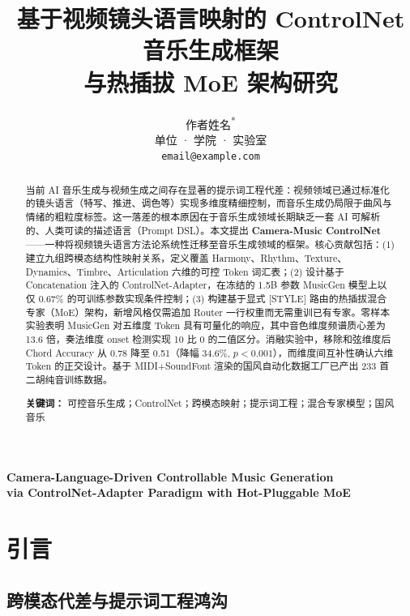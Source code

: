 \documentclass[11pt]{article}
\title{\vspace{-1.5cm}\bfseries 基于视频镜头语言映射的 ControlNet 音乐生成框架\\与热插拔 MoE 架构研究}
\author{作者姓名\textsuperscript{*} \\
{\small 单位 · 学院 · 实验室} \\
{\small \texttt{email@example.com}}}
\date{}
\begin{document}
\maketitle

\begin{center}
\textbf{Camera-Language-Driven Controllable Music Generation\\via ControlNet-Adapter Paradigm with Hot-Pluggable MoE}
\end{center}

\begin{abstract}
\noindent
当前 AI 音乐生成与视频生成之间存在显著的提示词工程代差：视频领域已通过标准化的镜头语言（特写、推进、调色等）实现多维度精细控制，而音乐生成仍局限于曲风与情绪的粗粒度标签。这一落差的根本原因在于音乐生成领域长期缺乏一套 AI 可解析的、人类可读的描述语言（Prompt DSL）。本文提出 \textbf{Camera-Music ControlNet}——一种将视频镜头语言方法论系统性迁移至音乐生成领域的框架。核心贡献包括：(1) 建立九组跨模态结构性映射关系，定义覆盖 Harmony、Rhythm、Texture、Dynamics、Timbre、Articulation 六维的可控 Token 词汇表；(2) 设计基于 Concatenation 注入的 ControlNet-Adapter，在冻结的 1.5B 参数 MusicGen 模型上以仅 0.67\% 的可训练参数实现条件控制；(3) 构建基于显式 [STYLE] 路由的热插拔混合专家（MoE）架构，新增风格仅需追加 Router 一行权重而无需重训已有专家。零样本实验表明 MusicGen 对五维度 Token 具有可量化的响应，其中音色维度频谱质心差为 13.6 倍，奏法维度 onset 检测实现 10 比 0 的二值区分。消融实验中，移除和弦维度后 Chord Accuracy 从 0.78 降至 0.51（降幅 34.6\%, $p<0.001$），而维度间互补性确认六维 Token 的正交设计。基于 MIDI+SoundFont 渲染的国风自动化数据工厂已产出 233 首二胡纯音训练数据。

\vspace{4pt}
\noindent\textbf{关键词：} 可控音乐生成；ControlNet；跨模态映射；提示词工程；混合专家模型；国风音乐
\end{abstract}

\section{引言}

\subsection{跨模态代差与提示词工程鸿沟}
\end{document}
